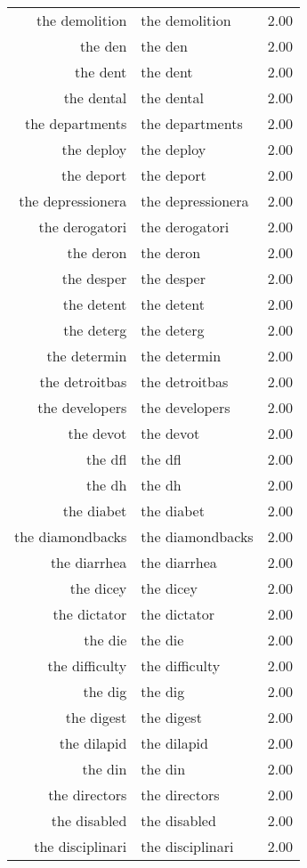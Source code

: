 \begin{table}[ht]
\begin{tabular}{rlr}
  the demolition & the demolition & 2.00 \\ 
  the den & the den & 2.00 \\ 
  the dent & the dent & 2.00 \\ 
  the dental & the dental & 2.00 \\ 
  the departments & the departments & 2.00 \\ 
  the deploy & the deploy & 2.00 \\ 
  the deport & the deport & 2.00 \\ 
  the depressionera & the depressionera & 2.00 \\ 
  the derogatori & the derogatori & 2.00 \\ 
  the deron & the deron & 2.00 \\ 
  the desper & the desper & 2.00 \\ 
  the detent & the detent & 2.00 \\ 
  the deterg & the deterg & 2.00 \\ 
  the determin & the determin & 2.00 \\ 
  the detroitbas & the detroitbas & 2.00 \\ 
  the developers & the developers & 2.00 \\ 
  the devot & the devot & 2.00 \\ 
  the dfl & the dfl & 2.00 \\ 
  the dh & the dh & 2.00 \\ 
  the diabet & the diabet & 2.00 \\ 
  the diamondbacks & the diamondbacks & 2.00 \\ 
  the diarrhea & the diarrhea & 2.00 \\ 
  the dicey & the dicey & 2.00 \\ 
  the dictator & the dictator & 2.00 \\ 
  the die & the die & 2.00 \\ 
  the difficulty & the difficulty & 2.00 \\ 
  the dig & the dig & 2.00 \\ 
  the digest & the digest & 2.00 \\ 
  the dilapid & the dilapid & 2.00 \\ 
  the din & the din & 2.00 \\ 
  the directors & the directors & 2.00 \\ 
  the disabled & the disabled & 2.00 \\ 
  the disciplinari & the disciplinari & 2.00 \\ 

\end{tabular}
\end{table}
